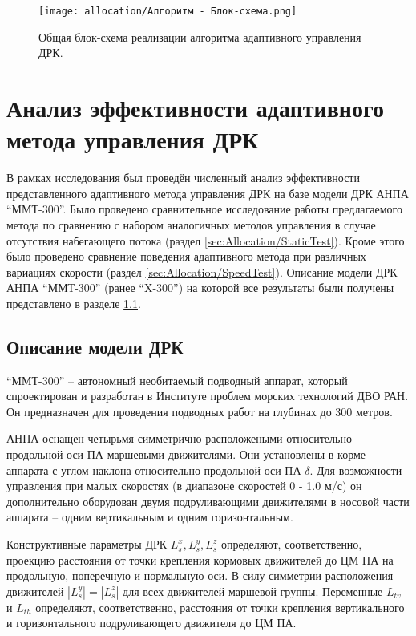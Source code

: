 
\begin{figure}[ht]
    \centering
    \texttt{[image: allocation/Алгоритм - Блок-схема.png]}
    \caption{Общая блок-схема реализации алгоритма адаптивного управления ДРК.}
    \label{fig:method_algorithm}
\end{figure}

\section{Анализ эффективности адаптивного метода управления ДРК}
В рамках исследования был проведён численный анализ эффективности представленного адаптивного метода управления ДРК на базе модели ДРК АНПА ``ММТ-300''\cite{борейко2019малогабаритный}.
Было проведено сравнительное исследование работы предлагаемого метода по сравнению с набором аналогичных методов управления в случае отсутствия набегающего потока (раздел \ref{sec:Allocation/StaticTest}).
Кроме этого было проведено сравнение поведения адаптивного метода при различных вариациях скорости (раздел \ref{sec:Allocation/SpeedTest}).
Описание модели ДРК АНПА ``ММТ-300'' (ранее ``X-300'') на которой все результаты были получены представлено в разделе \ref{ssec:Allocation/PropulsionDescription}.

\subsection{Описание модели ДРК}\label{ssec:Allocation/PropulsionDescription}
``ММТ-300'' -- автономный необитаемый подводный аппарат, который спроектирован и разработан в Институте проблем морских технологий ДВО РАН.
Он предназначен для проведения подводных работ на глубинах до 300 метров.

АНПА оснащен четырьмя симметрично расположеными относительно продольной оси ПА маршевыми движителями. 
Они установлены в корме аппарата с углом наклона относительно продольной оси ПА $\delta$.
Для возможности управления при малых скоростях (в диапазоне скоростей 0 - 1.0 м/с) он дополнительно оборудован двумя подруливающими движителями в носовой части аппарата -- одним вертикальным и одним горизонтальным.

Конструктивные параметры ДРК $L_s^x, L_s^y, L_s^z$ определяют, соответственно, проекцию расстояния от точки крепления кормовых движителей до ЦМ ПА на продольную, поперечную и нормальную оси.
В силу симметрии расположения движителей $|L_s^y| = |L_s^z|$ для всех движителей маршевой группы.
Переменные $L_{tv}$ и $L_{th}$ определяют, соответственно, расстояния от точки крепления вертикального и горизонтального подруливающего движителя до ЦМ ПА.


